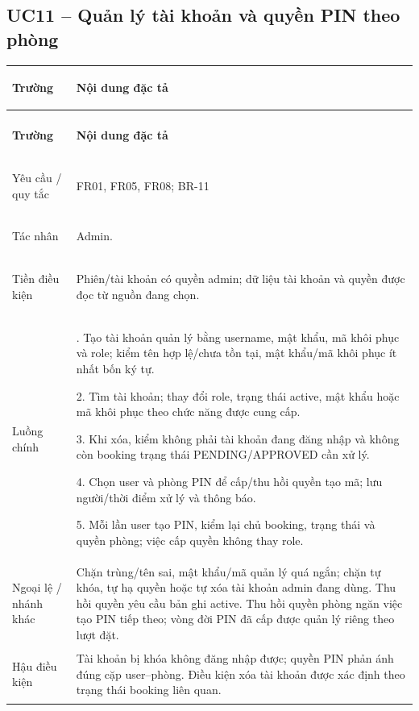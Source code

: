 \subsection{UC11 -- Quản lý tài khoản và quyền PIN theo phòng}\label{tab:uc11}
{\small\renewcommand{\arraystretch}{1.06}
\setlength{\tabcolsep}{6pt}\setlength{\extrarowheight}{2pt}
\renewcommand{\theHtable}{uc.\arabic{subsection}}\addtocounter{table}{-1}
\begin{longtable}{|>{\bfseries\raggedright\arraybackslash}p{3cm}|>{\raggedright\arraybackslash}p{\dimexpr\textwidth-3cm-4\tabcolsep-3\arrayrulewidth\relax}|}
\hline
\textbf{Trường} & \textbf{Nội dung đặc tả}\\\hline
\endfirsthead
\multicolumn{2}{r}{\small\itshape UC11 (tiếp)}\\
\hline
\textbf{Trường} & \textbf{Nội dung đặc tả}\\\hline
\endhead
\endlastfoot
Yêu cầu / quy tắc & FR01, FR05, FR08; BR-11\\*\hline
Tác nhân & Admin.\\*\hline
Tiền điều kiện & Phiên/tài khoản có quyền admin; dữ liệu tài khoản và quyền được đọc từ nguồn đang chọn.\\*\hline
Luồng chính & 1. Tạo tài khoản quản lý bằng username, mật khẩu, mã khôi phục và role; kiểm tên hợp lệ/chưa tồn tại, mật khẩu/mã khôi phục ít nhất bốn ký tự.\par
2. Tìm tài khoản; thay đổi role, trạng thái active, mật khẩu hoặc mã khôi phục theo chức năng được cung cấp.\par
3. Khi xóa, kiểm không phải tài khoản đang đăng nhập và không còn booking trạng thái PENDING/APPROVED cần xử lý.\par
4. Chọn user và phòng PIN để cấp/thu hồi quyền tạo mã; lưu người/thời điểm xử lý và thông báo.\par
5. Mỗi lần user tạo PIN, kiểm lại chủ booking, trạng thái và quyền phòng; việc cấp quyền không thay role.\\\hline
Ngoại lệ / nhánh khác & Chặn trùng/tên sai, mật khẩu/mã quản lý quá ngắn; chặn tự khóa, tự hạ quyền hoặc tự xóa tài khoản admin đang dùng. Thu hồi quyền yêu cầu bản ghi active. Thu hồi quyền phòng ngăn việc tạo PIN tiếp theo; vòng đời PIN đã cấp được quản lý riêng theo lượt đặt.\\\hline
Hậu điều kiện & Tài khoản bị khóa không đăng nhập được; quyền PIN phản ánh đúng cặp user--phòng. Điều kiện xóa tài khoản được xác định theo trạng thái booking liên quan.\\\hline
\end{longtable}}

